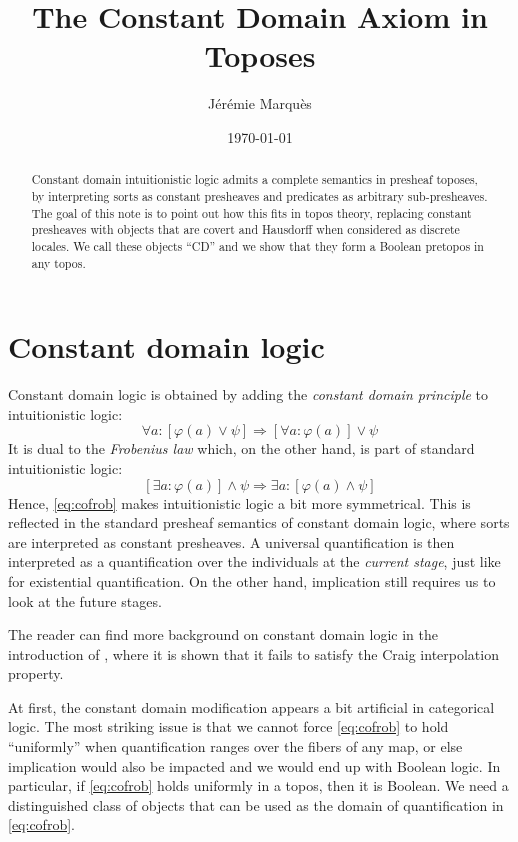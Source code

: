\documentclass[a4paper,12pt]{article}
\title{The Constant Domain Axiom in Toposes}
\date{\today}
\author{Jérémie Marquès}
\begin{document}
\maketitle

\begin{abstract}
	Constant domain intuitionistic logic admits a complete semantics in presheaf toposes, by interpreting sorts as constant presheaves and predicates as arbitrary sub-presheaves. The goal of this note is to point out how this fits in topos theory, replacing constant presheaves with objects that are covert and Hausdorff when considered as discrete locales. We call these objects ``CD'' and we show that they form a Boolean pretopos in any topos.
\end{abstract}

\section{Constant domain logic}

Constant domain logic is obtained by adding the \emph{constant domain principle} to intuitionistic logic:
\begin{equation}\label{eq:cofrob}\tag{CD}
	∀a:[φ(a)∨ψ] ⇒ [∀a:φ(a)] ∨ ψ
\end{equation}
It is dual to the \emph{Frobenius law} which, on the other hand, is part of standard intuitionistic logic:
\begin{equation}\label{eq:frob}\tag{Frob}
	[∃a:φ(a)] ∧ ψ ⇒ ∃a:[φ(a)∧ψ]
\end{equation}
Hence, \eqref{eq:cofrob} makes intuitionistic logic a bit more symmetrical. This is reflected in the standard presheaf semantics of constant domain logic, where sorts are interpreted as constant presheaves. A universal quantification is then interpreted as a quantification over the individuals at the \emph{current stage}, just like for existential quantification. On the other hand, implication still requires us to look at the future stages.

The reader can find more background on constant domain logic in the introduction of \cite{MinOlkUrq2013}, where it is shown that it fails to satisfy the Craig interpolation property.

At first, the constant domain modification appears a bit artificial in categorical logic. The most striking issue is that we cannot force \eqref{eq:cofrob} to hold ``uniformly'' when quantification ranges over the fibers of any map, or else implication would also be impacted and we would end up with Boolean logic. In particular, if \eqref{eq:cofrob} holds uniformly in a topos, then it is Boolean. We need a distinguished class of objects that can be used as the domain of quantification in \eqref{eq:cofrob}.
\end{document}
